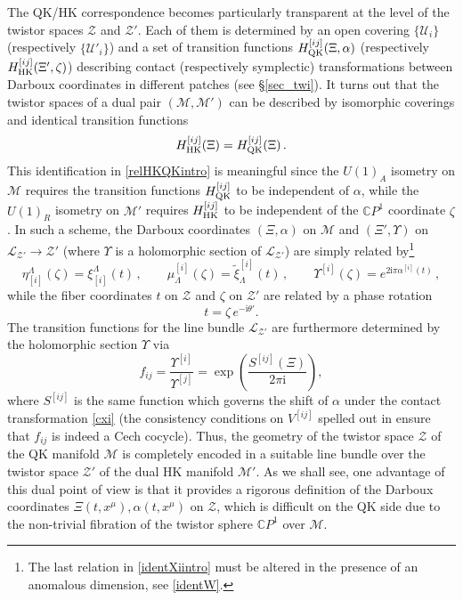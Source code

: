 \documentclass[12pt,reqno]{article}
\numberwithin{equation}{section}
\newcommand{\be}{\begin{equation}}
\newcommand{\ee}{\end{equation}}
\newcommand{\CP}{\IC P^1}
\newcommand{\I}{\mathrm{i}}
\newcommand{\cM}{\mathcal{M}}
\newcommand{\cU}{\mathcal{U}}
\newcommand{\cZ}{\mathcal{Z}}
\newcommand{\IC}{\mathbb{C}}
\newcommand{\lb}{\mathscr{L}}
\def\hHij#1{H^{[#1]}_{\rm HK}}
\def\qHij#1{H^{[#1]}_{\rm QK}}
\def\etai#1{\eta_{[#1]}}
\def\xii#1{\xi_{[#1]}}
\def\mui#1{\mu^{[#1]}}
\def\txii#1{{\tilde\xi}^{[#1]}}
\def\ai#1{{\alpha}^{[#1]}}
\def\ui#1{^{[#1]}}
\def\varpiqk{t}
\def\varpihk{\zeta}
\def\phip{{\theta'}}
\def\pcM{\cM'}
\def\pcZ{\cZ'}
\def\pXi{\Xi'}
\numberwithin{equation}{section}
\begin{document}
The QK/HK correspondence becomes particularly transparent at the level of
the twistor spaces $\cZ$ and $\pcZ$.
Each of them is determined by an open covering $\{\cU_i\}$ (respectively $\{\cU'_i\}$)
and a set of transition functions $\qHij{ij}(\Xi,\alpha)$ (respectively $\hHij{ij}(\pXi,\varpihk)$)
describing contact (respectively symplectic) transformations
between Darboux coordinates in different patches (see \S\ref{sec_twi}).
It turns out that the twistor spaces of a dual pair $(\cM,\pcM)$ can be described
by isomorphic coverings and  identical transition functions
\be
\hHij{ij}(\Xi)=\qHij{ij}(\Xi)\, .
\label{relHKQKintro}
\ee
This identification in \eqref{relHKQKintro}
is meaningful since the $U(1)_A$ isometry on $\cM$ requires
the transition functions $\qHij{ij}$
to be independent of $\alpha$, while the $U(1)_R$ isometry on $\pcM$
requires $\hHij{ij}$ to be independent of the $\CP$ coordinate $\varpihk$.
In such a scheme,  the Darboux coordinates
$(\Xi,\alpha)$ on $\cM$ and $(\Xi',\Upsilon)$ on $\lb_{\pcZ}\to \pcZ$
(where $\Upsilon$ is a holomorphic section of $\lb_{\pcZ}$)
are simply related
by\footnote{The last
relation in \eqref{identXiintro} must be altered in the presence of an anomalous dimension,
see \eqref{identW}.}
\be
\label{identXiintro}
\etai{i}^\Lambda(\varpihk)=\xii{i}^\Lambda(\varpiqk)\, ,
\qquad
\mui{i}_\Lambda(\varpihk )= \txii{i}_\Lambda(\varpiqk)\, ,
\qquad
\Upsilon\ui{i}(\varpihk) = e^{2\I\pi\ai{i}(\varpiqk)}\, ,
\ee
while the fiber coordinates $\varpiqk$ on $\cZ$ and $\varpihk$ on $\pcZ$ are
related by a phase rotation
\be
\varpiqk=\varpihk\, e^{-\I\phip}.
\label{relCP}
\ee
The transition functions for the line bundle $\lb_{\pcZ}$
are furthermore determined by the holomorphic section $\Upsilon$ via
\be
\label{fijLintro}
f_{ij} = \frac{\Upsilon\ui{i}}{\Upsilon\ui{j}}  = \exp\left( \frac{S\ui{ij}(\Xi)}{2\pi\I} \right),
\ee
where $S\ui{ij}$ is the same function which governs the shift of $\alpha$ under the contact transformation \eqref{cxi}
(the consistency conditions on $V\ui{ij}$  spelled
out in  \cite{Alexandrov:2008nk} ensure that $f_{ij}$ is indeed a Cech cocycle).
Thus, the geometry of the twistor space $\cZ$ of the QK manifold $\cM$ is completely
encoded in a suitable line bundle over the twistor space $\pcZ$
of the dual HK manifold $\pcM$.
As we shall see, one  advantage of this dual point of view is that it provides
a rigorous definition of the Darboux coordinates $\Xi(\varpiqk,x^\mu),\alpha(\varpiqk,x^\mu)$
on $\cZ$, which is difficult on the QK side due to the non-trivial fibration
of the twistor sphere $\CP$ over $\cM$.
\end{document}
